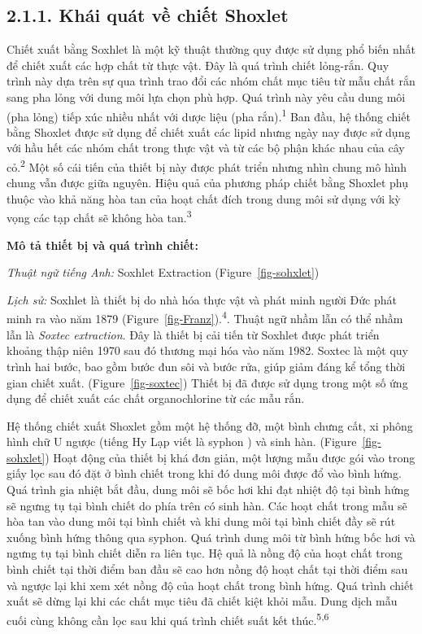 \documentclass[
  twocolumn,
  landscape]{report}
\begin{document}
\subsection{2.1.1. Khái quát về chiết
Shoxlet}\label{khuxe1i-quuxe1t-vux1ec1-chiux1ebft-shoxlet}

Chiết xuất bằng Soxhlet là một kỹ thuật thường quy được sử dụng phổ biến
nhất để chiết xuất các hợp chất từ thực vật. Đây là quá trình chiết
lỏng-rắn. Quy trình này dựa trên sự qua trình trao đổi các nhóm chất mục
tiêu từ mẫu chất rắn sang pha lỏng với dung môi lựa chọn phù hợp. Quá
trình này yêu cầu dung môi (pha lỏng) tiếp xúc nhiều nhất với dược liệu
(pha rắn).\textsuperscript{1} Ban đầu, hệ thống chiết bằng Shoxlet được
sử dụng để chiết xuất các lipid nhưng ngày nay được sử dụng với hầu hết
các nhóm chất trong thực vật và từ các bộ phận khác nhau của cây
cỏ.\textsuperscript{2} Một số cái tiến của thiết bị này được phát triển
nhưng nhìn chung mô hình chung vẫn được giữa nguyên. Hiệu quả của phương
pháp chiết bằng Shoxlet phụ thuộc vào khả năng hòa tan của hoạt chất
đích trong dung môi sử dụng với kỳ vọng các tạp chất sẽ không hòa
tan.\textsuperscript{3}

\textbf{Mô tả thiết bị và quá trình chiết:}

\emph{Thuật ngữ tiếng Anh:} Soxhlet Extraction
(Figure~\ref{fig-sohxlet})

\emph{Lịch sử:} Soxhlet là thiết bị do nhà hóa thực vật và phát minh
người Đức phát minh ra vào năm 1879
(Figure~\ref{fig-Franz}).\textsuperscript{4}. Thuật ngữ nhầm lẫn có thể
nhầm lẫn là \emph{Soxtec extraction}. Đây là thiết bị cải tiến từ
Soxhlet được phát triển khoảng thập niên 1970 sau đó thương mại hóa vào
năm 1982. Soxtec là một quy trình hai bước, bao gồm bước đun sôi và bước
rửa, giúp giảm đáng kể tổng thời gian chiết xuất.
(Figure~\ref{fig-soxtec}) Thiết bị đã được sử dụng trong một số ứng dụng
để chiết xuất các chất organochlorine từ các mẫu rắn.

Hệ thống chiết xuất Shoxlet gồm một hệ thống đỡ, một bình chưng cất, xi
phông hình chữ U ngược (tiếng Hy Lạp viết là syphon ) và sinh hàn.
(Figure~\ref{fig-sohxlet}) Hoạt động của thiết bị khá đơn giản, một
lượng mẫu được gói vào trong giấy lọc sau đó đặt ở bình chiết trong khi
đó dung môi được đổ vào bình hứng. Quá trình gia nhiệt bắt đầu, dung môi
sẽ bốc hơi khi đạt nhiệt độ tại bình hứng sẽ ngưng tụ tại bình chiết do
phía trên có sinh hàn. Các hoạt chất trong mẫu sẽ hòa tan vào dung môi
tại bình chiết và khi dung môi tại bình chiết đầy sẽ rút xuống bình hứng
thông qua syphon. Quá trình dung môi từ bình hứng bốc hơi và ngưng tụ
tại bình chiết diễn ra liên tục. Hệ quả là nồng độ của hoạt chất trong
bình chiết tại thời điểm ban đầu sẽ cao hơn nồng độ hoạt chất tại thời
điểm sau và ngược lại khi xem xét nồng độ của hoạt chất trong bình hứng.
Quá trình chiết xuất sẽ dừng lại khi các chất mục tiêu đã chiết kiệt
khỏi mẫu. Dung dịch mẫu cuối cùng không cần lọc sau khi quá trình chiết
suất kết thúc.\textsuperscript{5,6}
\end{document}
